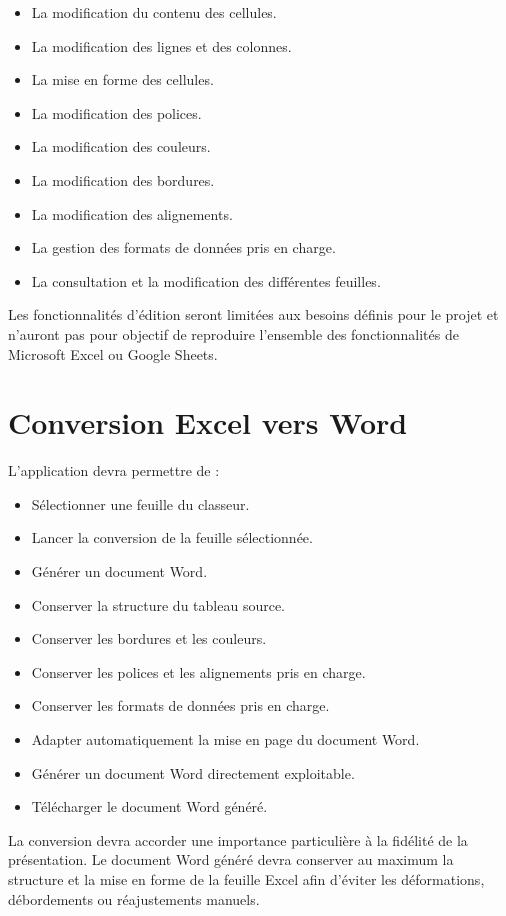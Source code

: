 \begin{itemize}
    \item La modification du contenu des cellules.
    \item La modification des lignes et des colonnes.
    \item La mise en forme des cellules.
    \item La modification des polices.
    \item La modification des couleurs.
    \item La modification des bordures.
    \item La modification des alignements.
    \item La gestion des formats de données pris en charge.
    \item La consultation et la modification des différentes feuilles.
\end{itemize}

Les fonctionnalités d'édition seront limitées aux besoins définis pour le projet et n'auront pas pour objectif de reproduire l'ensemble des fonctionnalités de Microsoft Excel ou Google Sheets.

\section{Conversion Excel vers Word}

L'application devra permettre de :

\begin{itemize}
    \item Sélectionner une feuille du classeur.
    \item Lancer la conversion de la feuille sélectionnée.
    \item Générer un document Word.
    \item Conserver la structure du tableau source.
    \item Conserver les bordures et les couleurs.
    \item Conserver les polices et les alignements pris en charge.
    \item Conserver les formats de données pris en charge.
    \item Adapter automatiquement la mise en page du document Word.
    \item Générer un document Word directement exploitable.
    \item Télécharger le document Word généré.
\end{itemize}

La conversion devra accorder une importance particulière à la fidélité de la présentation. Le document Word généré devra conserver au maximum la structure et la mise en forme de la feuille Excel afin d'éviter les déformations, débordements ou réajustements manuels.
